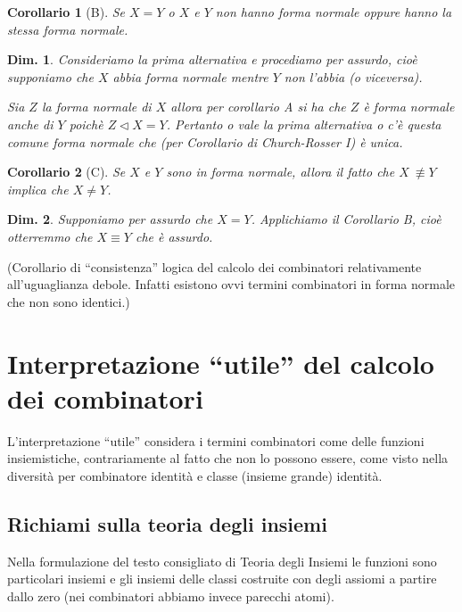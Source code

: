 \documentclass{book}
\newtheorem{dimostrazione}{Dim.}[chapter]
\newtheorem{corollario}{Corollario}[chapter]
\begin{document}
\begin{corollario}[B]
Se $X = Y$ o $X$ e $Y$ non hanno forma normale oppure hanno la stessa forma
normale.
\end{corollario}

\begin{dimostrazione}
Consideriamo la prima alternativa e procediamo per assurdo, cio\`e supponiamo
che $X$ abbia forma normale mentre $Y$ non l'abbia (o viceversa).

Sia $Z$ la forma normale di $X$ allora per corollario A si ha che $Z$ \`e
forma normale anche di $Y$ poich\`e $Z \vartriangleleft X = Y$. Pertanto o
vale la prima alternativa o c'\`e questa comune forma normale che (per
Corollario di Church-Rosser I) \`e unica.
\end{dimostrazione}

\begin{corollario}[C]
Se $X$ e $Y$ sono in forma normale, allora il fatto che $X\ \not\equiv Y$ 
implica che $X \neq Y$.
\end{corollario}

\begin{dimostrazione}
Supponiamo per assurdo che $X = Y$. Applichiamo il Corollario B, cio\`e
otterremmo che $X \equiv Y$ che \`e assurdo.
\end{dimostrazione}

\vspace{0.5 cm}(Corollario di ``consistenza'' logica del calcolo dei
combinatori relativamente all'uguaglianza debole. Infatti esistono ovvi
termini combinatori in forma normale che non sono identici.)


\section{Interpretazione ``utile'' del calcolo dei combinatori}
L'interpretazione ``utile'' considera i termini combinatori come delle funzioni
insiemistiche, contrariamente al fatto che non lo possono essere, come visto
nella diversit\`a per combinatore identit\`a e classe (insieme grande)
identit\`a.

\subsection{Richiami sulla teoria degli insiemi}
Nella formulazione del testo consigliato di Teoria degli Insiemi le
funzioni sono particolari insiemi e gli insiemi delle classi costruite
con degli assiomi a partire dallo zero (nei combinatori abbiamo invece
parecchi atomi).
\end{document}
